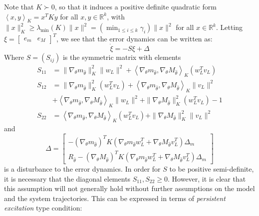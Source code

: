 \documentclass[letterpaper, 10 pt, conference]{ieeeconf}  %
\newcommand{\R}{\mathbb{R}}
\begin{document}
Note that $K \succ 0$, so that it induces a positive definite quadratic form $\left<x, y\right>_K = x^T K y$ for all $x,y \in \R^k$, with $\|x\|_K^2 \ge \lambda_{\min}(K) \|x\|^2 = \displaystyle \left(\min_{1 \le i \le k} \gamma_i\right)\|x\|^2$ for all $x \in \R^k$. Letting $\xi = \begin{bmatrix}
    e_m & e_M
\end{bmatrix}^T$, we see that the error dynamics can be written as:
\begin{equation}\label{eq: error_compressed}
    \dot{\xi} = -S\xi + \Delta
\end{equation}
Where $S = (S_{ij})$ is the symmetric matrix with elements
\begin{align*}
    S_{11} &= \|\nabla_\theta m_{\hat{\theta}}\|_K^2 \|w_L\|^2 + \left<\nabla_\theta m_{\hat{\theta}}, \nabla_\theta M_{\hat{\theta}}\right>_K (w_L^T v_L) \\
    S_{12} &= \|\nabla_\theta m_{\hat{\theta}}\|^2_K (w_L^T v_L) + \left<\nabla_\theta m_{\hat{\theta}}, \nabla_\theta M_{\hat{\theta}}\right>_K \|v_L\|^2 \\
    & + \left<\nabla_\theta m_{\hat{\theta}}, \nabla_\theta M_{\hat{\theta}}\right>_K \|w_L\|^2 + \|\nabla_\theta M_{\hat{\theta}}\|_K^2 (w_L^T v_L) - 1 \\
    S_{22} &= \left<\nabla_\theta m_{\hat{\theta}}, \nabla_\theta M_{\hat{\theta}}\right>_K (w_L^T v_L) + \|\nabla_\theta M_{\hat{\theta}}\|_K^2 \|v_L\|^2
\end{align*}
and 
$$\Delta = \begin{bmatrix}
    -(\nabla_{\theta} m_{\hat{\theta}})^T K \left(\nabla_\theta m_{\hat{\theta}} w_L^T + \nabla_\theta M_{\hat{\theta}} v_L^T \right) \Delta_m \\
    R_{\hat{\theta}}-(\nabla_{\theta} M_{\hat{\theta}})^T K \left(\nabla_\theta m_{\hat{\theta}} w_L^T + \nabla_\theta M_{\hat{\theta}} v_L^T \right) \Delta_m
\end{bmatrix}$$
is a disturbance to the error dynamics. In order for $S$ to be positive semi-definite, it is necessary that the diagonal elements $S_{11}, S_{22} \ge 0$. However, it is clear that this assumption will not generally hold without further assumptions on the model and the system trajectories. This can be expressed in terms of \textit{persistent excitation} type condition:
\end{document}
